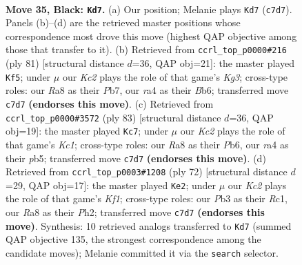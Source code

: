 \documentclass[11pt]{article}
\begin{document}
\clearpage

\begin{figure}[p]\centering
\begin{subfigure}{0.46\textwidth}\centering
\resizebox{\linewidth}{!}{%
\newchessgame
\chessboard[
  setfen={r7/2k5/b1p1p2N/P3P2p/R4P1P/1p6/1b5K/1N6 b - - 5 35},
  showmover=false,
  pgfstyle=straightmove, color=movearrow, markmove={c7-d7}
]}
\caption{}
\end{subfigure}\hfill
\begin{subfigure}{0.46\textwidth}\centering
\resizebox{\linewidth}{!}{%
\newchessgame
\chessboard[
  setfen={8/1p6/1bp3k1/p7/P6P/2P3K1/1P2r3/1R3N2 b - - 3 41},
  showmover=false,
  pgfstyle=straightmove, color=movearrow, markmove={g6-f5}
]}
\caption{}
\end{subfigure}
\\[4pt]
\begin{subfigure}{0.46\textwidth}\centering
\resizebox{\linewidth}{!}{%
\newchessgame
\chessboard[
  setfen={2k5/5p2/1pP1p3/1P2P1p1/2R4p/3N1P1P/r7/b2K4 b - - 0 42},
  showmover=false,
  pgfstyle=straightmove, color=movearrow, markmove={c8-c7}
]}
\caption{}
\end{subfigure}\hfill
\begin{subfigure}{0.46\textwidth}\centering
\resizebox{\linewidth}{!}{%
\newchessgame
\chessboard[
  setfen={r7/3kp2p/6p1/p2Pp3/P3n3/1P6/6PP/2R1BK2 w - - 6 37},
  showmover=false,
  pgfstyle=straightmove, color=movearrow, markmove={f1-e2}
]}
\caption{}
\end{subfigure}
\caption{\textbf{Move 35, Black: \texttt{Kd7}.} (a) Our position; Melanie plays \texttt{Kd7} (\texttt{c7d7}). Panels (b)--(d) are the retrieved master positions whose correspondence most drove this move (highest QAP objective among those that transfer to it). (b) Retrieved from \texttt{ccrl\_top\_p0000\#216} (ply 81) [structural distance $d$=36, QAP obj=21]: the master played \texttt{Kf5}; under $\mu$ our \emph{Kc2} plays the role of that game's \emph{Kg3}; cross-type roles: our \emph{R}a8 as their \emph{P}b7, our \emph{r}a4 as their \emph{B}b6; transferred move \texttt{c7d7} \textbf{(endorses this move)}. (c) Retrieved from \texttt{ccrl\_top\_p0000\#3572} (ply 83) [structural distance $d$=36, QAP obj=19]: the master played \texttt{Kc7}; under $\mu$ our \emph{Kc2} plays the role of that game's \emph{Kc1}; cross-type roles: our \emph{R}a8 as their \emph{P}b6, our \emph{r}a4 as their \emph{p}b5; transferred move \texttt{c7d7} \textbf{(endorses this move)}. (d) Retrieved from \texttt{ccrl\_top\_p0003\#1208} (ply 72) [structural distance $d$=29, QAP obj=17]: the master played \texttt{Ke2}; under $\mu$ our \emph{Kc2} plays the role of that game's \emph{Kf1}; cross-type roles: our \emph{P}b3 as their \emph{R}c1, our \emph{R}a8 as their \emph{P}h2; transferred move \texttt{c7d7} \textbf{(endorses this move)}. Synthesis: 10 retrieved analogs transferred to \texttt{Kd7} (summed QAP objective 135, the strongest correspondence among the candidate moves); Melanie committed it via the \texttt{search} selector.}
\label{fig:thought-m69}
\end{figure}
\end{document}
